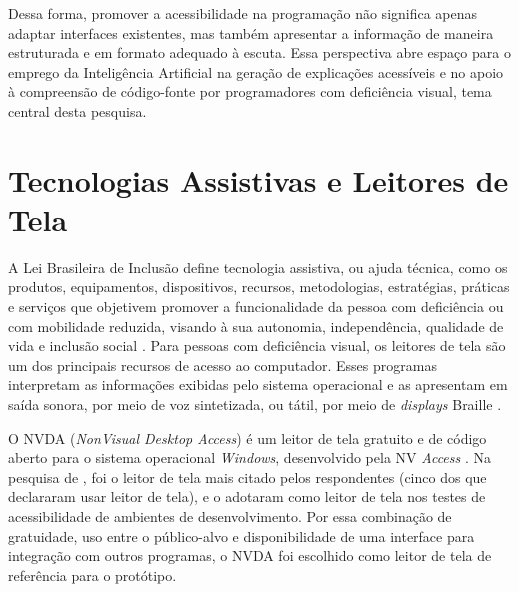 \documentclass[
    12pt,                   %
    openright,              %
    oneside,                %
    a4paper,                %
    sumario=tradicional,    %
    english,                %
    brazil,                 %
    ]{abntex2}
\begin{document}
Dessa forma, promover a acessibilidade na programação não significa apenas adaptar interfaces existentes, mas também apresentar a informação de maneira estruturada e em formato adequado à escuta. Essa perspectiva abre espaço para o emprego da Inteligência Artificial na geração de explicações acessíveis e no apoio à compreensão de código-fonte por programadores com deficiência visual, tema central desta pesquisa.

\section{Tecnologias Assistivas e Leitores de Tela}\label{sec:TecAssistivas}

A Lei Brasileira de Inclusão define tecnologia assistiva, ou ajuda técnica, como os produtos, equipamentos, dispositivos, recursos, metodologias, estratégias, práticas e serviços que objetivem promover a funcionalidade da pessoa com deficiência ou com mobilidade reduzida, visando à sua autonomia, independência, qualidade de vida e inclusão social \cite{brasil2015lbi}. Para pessoas com deficiência visual, os leitores de tela são um dos principais recursos de acesso ao computador. Esses programas interpretam as informações exibidas pelo sistema operacional e as apresentam em saída sonora, por meio de voz sintetizada, ou tátil, por meio de \textit{displays} Braille \cite{nvaccess2026guia}.

O NVDA (\textit{NonVisual Desktop Access}) é um leitor de tela gratuito e de código aberto para o sistema operacional \textit{Windows}, desenvolvido pela NV \textit{Access} \cite{nvaccess2026guia}. Na pesquisa de \textcite{latinoware20457}, foi o leitor de tela mais citado pelos respondentes (cinco dos que declararam usar leitor de tela), e \textcite{latinoware6969} o adotaram como leitor de tela nos testes de acessibilidade de ambientes de desenvolvimento. Por essa combinação de gratuidade, uso entre o público-alvo e disponibilidade de uma interface para integração com outros programas, o NVDA foi escolhido como leitor de tela de referência para o protótipo.
\end{document}
